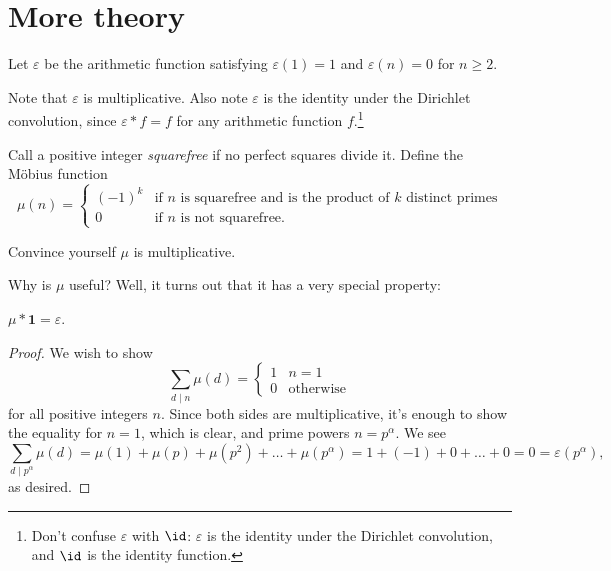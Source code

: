 \documentclass[11pt]{scrartcl}
\begin{document}
\section{More theory}

\begin{definition}
    Let $\varepsilon$ be the arithmetic function satisfying $\varepsilon(1) = 1$ and $\varepsilon(n) = 0$ for $n \ge 2$.
\end{definition}

Note that $\varepsilon$ is multiplicative. Also note $\varepsilon$ is the identity under the Dirichlet convolution, since $\varepsilon \ast f = f$ for any arithmetic function $f$.\footnote{Don't confuse $\varepsilon$ with $\id$: $\varepsilon$ is the identity under the Dirichlet convolution, and $\id$ is the identity function.}

\begin{definition}
    Call a positive integer \emph{squarefree} if no perfect squares divide it. Define the M\"obius function
    \[\mu(n) = \begin{cases}
	    (-1)^k & \text{if $n$ is squarefree and is the product of $k$ distinct primes} \\
	    0      & \text{if $n$ is not squarefree.}
    \end{cases}\]
\end{definition}

\begin{problem}
	Convince yourself $\mu$ is multiplicative.
\end{problem}

Why is $\mu$ useful? Well, it turns out that it has a very special property:

\begin{theorem}\label{thm:1_inverse}
	$\mu \ast \mathbf 1 = \varepsilon$.
\end{theorem}

\begin{proof}
	We wish to show
	\[\sum_{d \mid n}\mu(d) = \begin{cases}
		1 & n = 1 \\
		0 & \text{otherwise}
	\end{cases}\]
	for all positive integers $n$. Since both sides are multiplicative, it's enough to show the equality for $n = 1$, which is clear, and prime powers $n = p^\alpha$. We see
	\[\sum_{d \mid p^\alpha}\mu(d) = \mu(1) + \mu(p) + \mu(p^2) + \dots + \mu(p^\alpha) = 1 + (-1) + 0 + \dots + 0 = 0 = \varepsilon(p^\alpha),\]
	as desired.
\end{proof}
\end{document}
